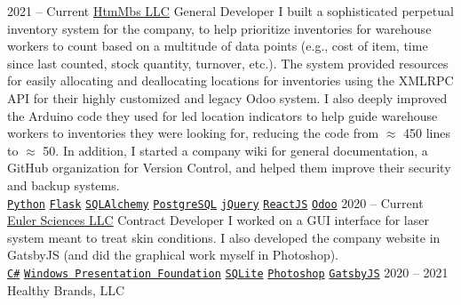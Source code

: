 \documentclass[9pt]{developercv} %
\begin{document}
\begin{entrylist}
    \entry
        {2021 -- Current}
        {\href{https://mbs-standoffs.com}{HtmMbs LLC}}
        {General Developer}
        {
            I built a sophisticated perpetual inventory system for the company,
            to help prioritize inventories for warehouse workers to count based
            on a multitude of data points (e.g., cost of item, time since last
            counted, stock quantity, turnover, etc.). The system provided
            resources for easily allocating and deallocating locations for
            inventories using the XMLRPC API for their highly customized and
            legacy Odoo system. I also deeply improved the Arduino code they
            used for led location indicators to help guide warehouse workers to
            inventories they were looking for, reducing the code from $\approx$
            450 lines to $\approx$ 50. In addition, I started a company wiki for
            general documentation, a GitHub organization for Version Control,
            and helped them improve their security and backup systems.
        \\
        \texttt{{\href{https://www.python.org/}{Python}}}\slashsep
        \texttt{{\href{https://flask.palletsprojects.com/en/1.1.x/}{Flask}}}\slashsep
        \texttt{{\href{https://www.sqlalchemy.org/}{SQLAlchemy}}}\slashsep
        \texttt{{\href{https://www.postgresql.org/}{PostgreSQL}}}\slashsep
        \texttt{{\href{https://jquery.com/}{jQuery}}}\slashsep
        \texttt{{\href{https://reactjs.org/}{ReactJS}}}\slashsep
        \texttt{{\href{https://www.odoo.com/}{Odoo}}}
        }
    \entry
        {2020 -- Current}
        {\href{https://euler-sci.com}{Euler Sciences LLC}}
        {Contract Developer}
        {
            I worked on a GUI interface for laser system meant to treat skin
            conditions. I also developed the company website in GatsbyJS (and
            did the graphical work myself in Photoshop).
        \\
        \texttt{{\href{https://en.wikipedia.org/wiki/C_Sharp_(programming_language)}{C\#}}}\slashsep
        \texttt{{\href{https://en.wikipedia.org/wiki/Windows_Presentation_Foundation}{Windows Presentation Foundation}}}\slashsep
        \texttt{{\href{https://www.sqlite.org/index.html}{SQLite}}}\slashsep
        \texttt{{\href{https://www.adobe.com/products/photoshop.html}{Photoshop}}}\slashsep
        \texttt{{\href{https://www.gatsbyjs.org/}{GatsbyJS}}}
        }
    \entry
        {2020 -- 2021}
        {Healthy Brands, LLC}

\end{entrylist}
\end{document}
